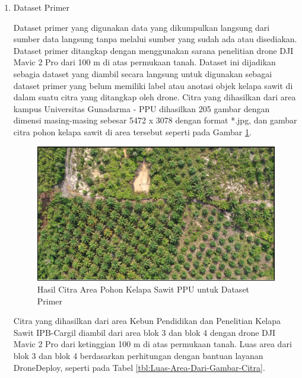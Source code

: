 \begin{enumerate}
	\item Dataset Primer
	
	Dataset primer yang digunakan data yang dikumpulkan langsung dari sumber data langsung tanpa melalui sumber yang sudah ada atau disediakan. Dataset primer ditangkap dengan menggunakan sarana penelitian drone DJI Mavic 2 Pro dari 100 m di atas permukaan tanah. Dataset ini dijadikan sebagia dataset yang diambil secara langsung untuk digunakan sebagai dataset primer yang belum memiliki label atau anotasi objek kelapa sawit di dalam suatu citra yang ditangkap oleh drone. Citra yang dihasilkan dari area kampus Universitas Gunadarma - PPU dihasilkan 205 gambar dengan dimensi masing-masing sebesar 5472 x 3078 dengan format *.jpg, dan gambar citra pohon kelapa sawit di area tersebut seperti pada Gambar \ref{img:Hasil-Citra-Area-Pohon}.
	
	\begin{figure}[H]
		\vspace{-0.1cm}
		\begin{center}
			\includegraphics[width=1\columnwidth]{bab3/Gambar/Picture5.png}
		\end{center}
		\vspace{-0.2cm}
		\captionsetup{justification=centering}
		\caption{Hasil Citra Area Pohon Kelapa Sawit PPU untuk Dataset Primer}\label{img:Hasil-Citra-Area-Pohon}
	\end{figure}
	
	Citra yang dihasilkan dari area Kebun Pendidikan dan Penelitian Kelapa Sawit IPB-Cargil diambil dari area blok 3 dan blok 4 dengan drone DJI Mavic 2 Pro dari ketinggian 100 m di atas permukaan tanah. Luas area dari blok 3 dan blok 4 berdasarkan perhitungan dengan bantuan layanan DroneDeploy, seperti pada Tabel \ref{tbl:Luas-Area-Dari-Gambar-Citra}.
	

\end{enumerate}
